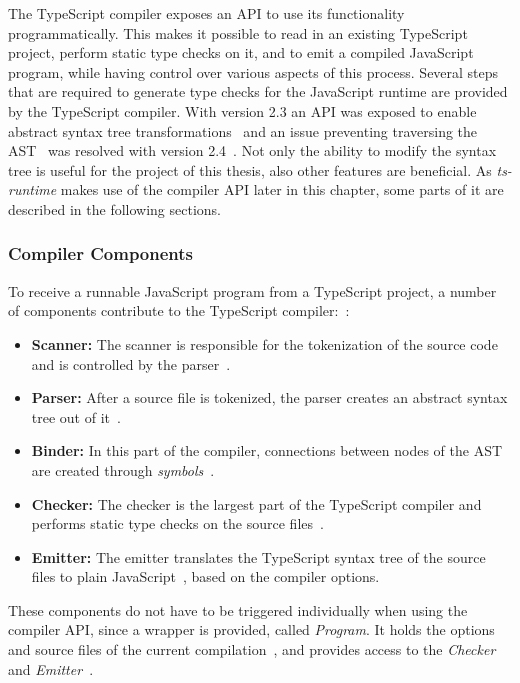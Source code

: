 The TypeScript compiler exposes an API to use its functionality programmatically. This makes it possible to read in an existing TypeScript project, perform static type checks on it, and to emit a compiled JavaScript program, while having control over various aspects of this process. Several steps that are required to generate type checks for the JavaScript runtime are provided by the TypeScript compiler. With version 2.3 an API was exposed to enable abstract syntax tree transformations~\cite{TypeScriptPullRequest:Transformation} and an issue preventing traversing the AST~\cite{TypeScriptIssue:Visitors} was resolved with version 2.4~\cite{TypeScriptPullRequest:Visitors}. Not only the ability to modify the syntax tree is useful for the project of this thesis, also other features are beneficial. As \emph{ts-runtime} makes use of the compiler API later in this chapter, some parts of it are described in the following sections.

\subsubsection{Compiler Components}

To receive a runnable JavaScript program from a TypeScript project, a number of components contribute to the TypeScript compiler:~\cite[p.~251]{TypeScriptBook:Syed:2017}:
\begin{itemize}
  \item \textbf{Scanner:} The scanner is responsible for the tokenization of the source code and is controlled by the parser~\cite[p.~260]{TypeScriptBook:Syed:2017}.
  \item \textbf{Parser:} After a source file is tokenized, the parser creates an abstract syntax tree out of it~\cite[p.~263]{TypeScriptBook:Syed:2017}.
  \item \textbf{Binder:} In this part of the compiler, connections between nodes of the AST are created through \emph{symbols}~\cite[p.~267]{TypeScriptBook:Syed:2017}.
  \item \textbf{Checker:} The checker is the largest part of the TypeScript compiler and performs static type checks on the source files~\cite[p.~282]{TypeScriptBook:Syed:2017}.
  \item \textbf{Emitter:} The emitter translates the TypeScript syntax tree of the source files to plain JavaScript~\cite[p.~286]{TypeScriptBook:Syed:2017}, based on the compiler options.
\end{itemize}
These components do not have to be triggered individually when using the compiler API, since a wrapper is provided, called \emph{Program}. It holds the options and source files of the current compilation~\cite[p.~254]{TypeScriptBook:Syed:2017}, and provides access to the \emph{Checker}~\cite[p.~282]{TypeScriptBook:Syed:2017} and \emph{Emitter}~\cite[p.~286]{TypeScriptBook:Syed:2017}.

